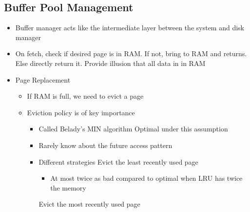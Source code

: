 \subsection{Buffer Pool Management}
\begin{itemize}
    \item Buffer manager acts like the intermediate layer between the system and disk manager
    \item On fetch, check if desired page is in RAM. If not, bring to RAM and returns. Else directly return it.
     Provide illusion that all data in in RAM
    \item Page Replacement
        \begin{itemize}
            \item If RAM is full, we need to evict a page
            \item Eviction policy is of key importance
                \begin{itemize}
                     Evict block whose next access is farthest in the future
                    \item Called Belady's MIN algorithm
                    \ipro Optimal under this assumption
                \end{itemize}
                \begin{itemize}
                    \item Rarely know about the future access pattern
                    \item Different strategies
                     Evict the least recently used page
                        \begin{itemize}
                            \ipro Works well for repeated access to popular pages
                            \icon $100\%$ miss under sequential flooding
                                \begin{itemize}
                                     Access in a repeated pattern but such that not all pages fit into RAM
                                \end{itemize}
                            \item At most twice as bad compared to optimal when LRU has twice the memory 
                        \end{itemize}
                     Evict the most recently used page

\end{itemize}
\end{itemize}
\end{itemize}
